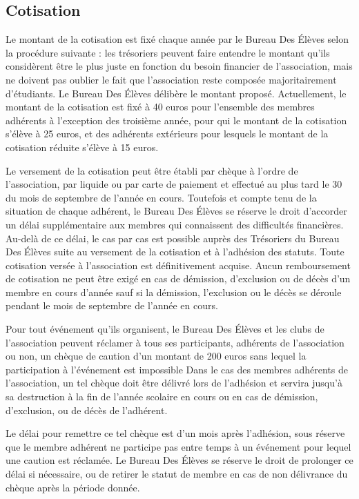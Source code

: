 \documentclass{article} %
\begin{document}
		\subsection{Cotisation}

			Le montant de la cotisation est fixé chaque année par le Bureau Des
			Élèves selon la procédure suivante : les trésoriers peuvent faire
			entendre le montant qu’ils considèrent être le plus juste en
			fonction du besoin financier de l’association, mais ne doivent pas
			oublier le fait que l’association reste composée majoritairement
			d'étudiants. Le Bureau Des Élèves délibère le montant proposé.
			Actuellement, le montant de la cotisation est fixé à 40 euros pour
			l’ensemble des membres adhérents à l’exception des troisième année,
			pour qui le montant de la cotisation s’élève à 25 euros, et des
			adhérents extérieurs pour lesquels le montant de la cotisation
			réduite s’élève à 15 euros.

			Le versement de la cotisation peut être établi par chèque à l’ordre
			de l’association, par liquide ou par carte de paiement et effectué
			au plus tard le 30 du mois de septembre de l’année en cours.
			Toutefois et compte tenu de la situation de chaque adhérent, le
			Bureau Des Élèves se réserve le droit d’accorder un délai
			supplémentaire aux membres qui connaissent des difficultés
			financières. Au-delà de ce délai, le cas par cas est possible auprès
			des Trésoriers du Bureau Des Élèves suite au versement de la
			cotisation et à l’adhésion des statuts. Toute cotisation versée à
			l’association est définitivement acquise. Aucun remboursement de
			cotisation ne peut être exigé en cas de démission, d’exclusion ou de
			décès d’un membre en cours d’année sauf si la démission, l’exclusion
			ou le décès se déroule pendant le mois de septembre de l’année en
			cours.

			Pour tout événement qu’ils organisent, le Bureau Des Élèves et les
			clubs de l’association peuvent réclamer à tous ses participants,
			adhérents de l’association ou non, un chèque de caution d’un montant
			de 200 euros sans lequel la participation à l’événement est
			impossible Dans le cas des membres adhérents de l’association, un
			tel chèque doit être délivré lors de l’adhésion et servira jusqu’à
			sa destruction à la fin de l’année scolaire en cours ou en cas de
			démission, d’exclusion, ou de décès de l’adhérent. 

			Le délai pour remettre ce tel chèque est d’un mois après l’adhésion,
			sous réserve que le membre adhérent ne participe pas entre temps à
			un événement pour lequel une caution est réclamée. Le Bureau Des
			Élèves se réserve le droit de prolonger ce délai si nécessaire, ou
			de retirer le statut de membre en cas de non délivrance du chèque
			après la période donnée. 
\end{document}
